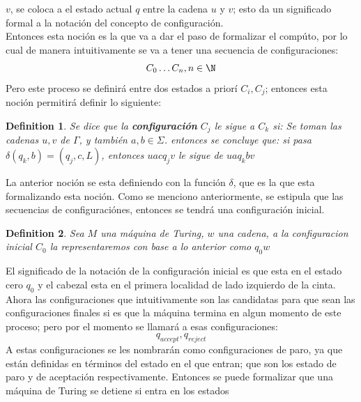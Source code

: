 \documentclass[10pt]{report}
\newtheorem{definition}{Definition}
\begin{document}
    $v$, se coloca a el estado actual $q$ entre la cadena $u$ y $v$; esto da un significado formal a la notación del concepto
    de configuración.
    \\
    \newline
    Entonces esta noción es la que va a dar el paso de formalizar el compúto, por lo cual de manera intuitivamente se va
    a tener una secuencia de configuraciones:
    \begin{equation}
        C_{0}\mathellipsis C_{n}, n\in \N
    \end{equation}
    Pero este proceso se definirá entre dos estados a priorí $C_{i},C_{j}$;
    entonces esta noción permitirá definir lo siguiente:
    \begin{definition}
        Se dice que la \textbf{configuración} $C_{j}$ le sigue a $C_{k}$ si:
        Se toman las cadenas $u,v$ de $\Gamma$, y también $a,b\in \Sigma$.
        entonces se concluye que: si pasa $\delta(q_{k},b) = (q_{j},c,L)$,
        entonces $uacq_{j}v$ le sigue de $uaq_{k}bv$

    \end{definition}
    La anterior noción se esta definiendo con la función $\delta$, que es la que esta formalizando esta noción.
    Como se menciono anteriormente, se estipula que las secuencias de configuraciónes, entonces se tendrá una configuración
    inicial.
    \begin{definition}
        Sea $M$ una máquina de Turing, $w$ una cadena,
        a la configuracion inicial $C_{0}$ la representaremos con base a lo anterior como $q_{0}w$
        \end{definition}
    El significado de la notación de la configuración inicial es que esta en
    el estado cero $q_{0}$ y el cabezal esta en el primera localidad de lado izquierdo de la cinta.
    Ahora las configuraciones que intuitivamente son las candidatas para
    que sean las configuraciones finales si es que la máquina termina en algun momento de este
    proceso; pero por el momento se llamará a esas configuraciones:\newline
    \begin{equation}
        q_{accept}, q_{reject}\label{eq:equation8}
    \end{equation}
    A estas configuraciones se les nombrarán como configuraciones de paro, ya que están definidas
    en términos del estado en el que entran; que son los estado de paro y de aceptación respectivamente.
    Entonces se puede formalizar que una máquina de Turing se detiene si entra en los estados
\end{document}
